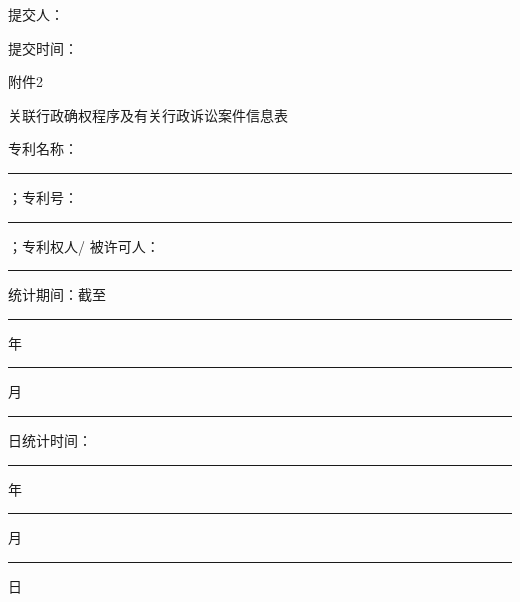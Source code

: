 \vspace{20bp}
\noindent\fontsize{10.5bp}{10.5bp}\selectfont 提交人：\par
\noindent\fontsize{10.5bp}{10.5bp}\selectfont 提交时间：

\newpage

\begin{center}
    {\fzdbs\fontsize{18bp}{18bp}\selectfont 附件2}\par
    \vspace{5bp}
    {\fzdbs\fontsize{14bp}{14bp}\selectfont 关联行政确权程序及有关行政诉讼案件信息表}\par
\end{center}
\vspace{5bp}
\noindent\fontsize{9bp}{12bp}\selectfont 专利名称：\rule{80bp}{0.5pt}；专利号：\rule{80bp}{0.5pt}；专利权人/ 被许可人：\rule{80bp}{0.5pt}\par
\noindent\fontsize{9bp}{12bp}\selectfont 统计期间：截至\rule{20bp}{0.5pt}年\rule{15bp}{0.5pt}月\rule{15bp}{0.5pt}日\hspace{2em}统计时间：\rule{20bp}{0.5pt}年\rule{15bp}{0.5pt}月\rule{15bp}{0.5pt}日\par
\vspace{5bp}

